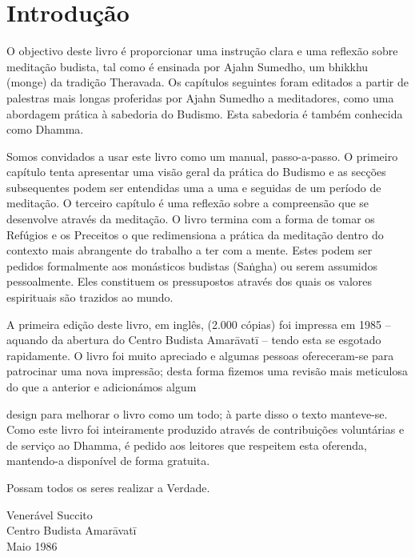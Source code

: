 \chapter{Introdução}

O objectivo deste livro é proporcionar uma instrução clara e uma
reflexão sobre meditação budista, tal como é ensinada por Ajahn Sumedho,
um bhikkhu (monge) da tradição Theravada. Os capítulos seguintes foram
editados a partir de palestras mais longas proferidas por Ajahn Sumedho
a meditadores, como uma abordagem prática à sabedoria do Budismo. Esta
sabedoria é também conhecida como Dhamma.

Somos convidados a usar este livro como um manual, passo-a-passo.
O primeiro capítulo tenta apresentar uma visão geral da
prática do Budismo e as secções subsequentes podem ser entendidas uma a
uma e seguidas de um período de meditação. O terceiro capítulo é uma
reflexão sobre a compreensão que se desenvolve através da meditação. O
livro termina com a forma de tomar os Refúgios e os Preceitos o que
redimensiona a prática da meditação dentro do contexto mais abrangente
do trabalho a ter com a mente. Estes podem ser pedidos formalmente aos
monásticos budistas (Saṅgha) ou serem assumidos pessoalmente. Eles
constituem os pressupostos através dos quais os valores espirituais são
trazidos ao mundo.

A primeira edição deste livro, em inglês, (2.000 cópias) foi impressa em
1985 -- aquando da abertura do Centro Budista Amarāvatī -- tendo esta se
esgotado rapidamente. O livro foi muito apreciado e algumas pessoas
ofereceram-se para patrocinar uma nova impressão; desta forma fizemos
uma revisão mais meticulosa do que a anterior e adicionámos algum

design para melhorar o livro como um todo; à parte disso o texto
manteve-se. Como este livro foi inteiramente produzido através de
contribuições voluntárias e de serviço ao Dhamma, é pedido aos leitores
que respeitem esta oferenda, mantendo-a disponível de forma gratuita.

Possam todos os seres realizar a Verdade.

\bigskip

{\raggedleft
Venerável Succito\\
Centro Budista Amarāvatī\\
Maio 1986
\par}



